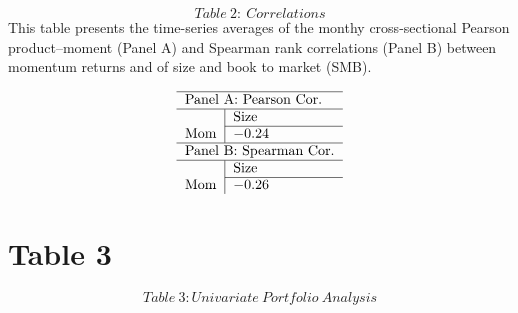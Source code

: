 \documentclass[11pt]{article}
\begin{document}
\bigskip 
\begin{equation*}
Table~2:~Correlations
\end{equation*}%
This table presents the time-series averages of the monthy cross-sectional
Pearson product--moment (Panel A) and Spearman rank correlations (Panel B)
between momentum returns and of size and book to market (SMB).

\begin{equation*}
\begin{tabular}{l|l}
\hline
\multicolumn{2}{l}{Panel A: Pearson Cor.} \\ \hline
& Size \\ \cline{2-2}
Mom & $-0.24$ \\ \hline
\multicolumn{2}{l}{Panel B: Spearman Cor.} \\ \hline
& Size \\ \cline{2-2}
Mom & $-0.26$%
\end{tabular}%
\end{equation*}

\bigskip 

\section{Table 3}

\begin{equation*}
Table~3:Univariate~Portfolio~Analysis 
\end{equation*}
\end{document}
